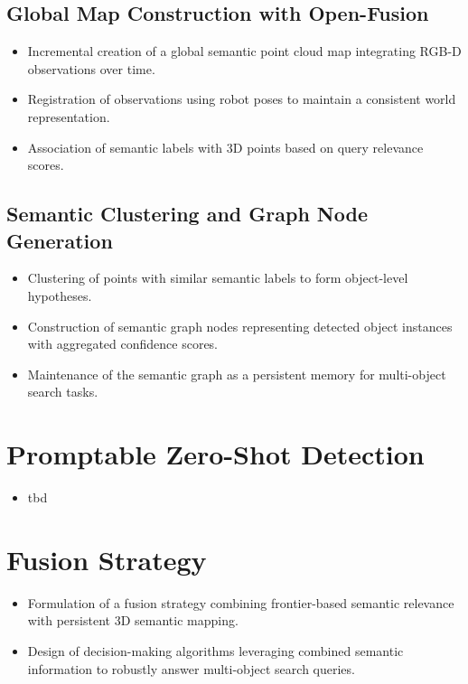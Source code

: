 \subsection{Global Map Construction with Open-Fusion}
\begin{itemize}
    \item Incremental creation of a global semantic point cloud map integrating RGB-D observations over time.
    \item Registration of observations using robot poses to maintain a consistent world representation.
    \item Association of semantic labels with 3D points based on query relevance scores.
\end{itemize}

\subsection{Semantic Clustering and Graph Node Generation}
\begin{itemize}
    \item Clustering of points with similar semantic labels to form object-level hypotheses.
    \item Construction of semantic graph nodes representing detected object instances with aggregated confidence scores.
    \item Maintenance of the semantic graph as a persistent memory for multi-object search tasks.
\end{itemize}

\section{Promptable Zero-Shot Detection} \label{sec:zero_shot_detection}\begin{itemize}
    \item tbd
\end{itemize}

\section{Fusion Strategy} \label{sec:fusion_strategy}\begin{itemize}
    \item Formulation of a fusion strategy combining frontier-based semantic relevance with persistent 3D semantic mapping.
    \item Design of decision-making algorithms leveraging combined semantic information to robustly answer multi-object search queries.
\end{itemize}
